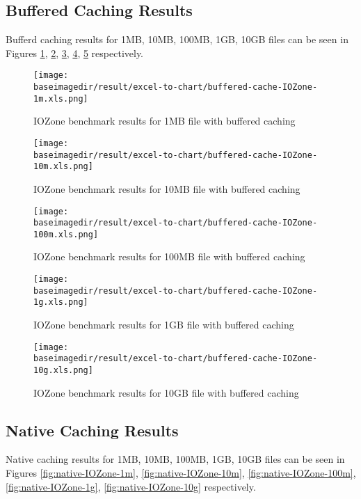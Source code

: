 \documentclass{article}
\newcommand{\baseimagedir}{..}
\begin{document}
\subsection{Buffered Caching Results}
Bufferd caching results for 1MB, 10MB, 100MB, 1GB, 10GB files can be seen in Figures \ref{fig:buffered-IOZone-1m}, \ref{fig:buffered-IOZone-10m}, \ref{fig:buffered-IOZone-100m}, \ref{fig:buffered-IOZone-1g}, \ref{fig:buffered-IOZone-10g} respectively.

\begin{figure}
    \centering
    \texttt{[image: \\baseimagedir/result/excel-to-chart/buffered-cache-IOZone-1m.xls.png]}
    \caption{IOZone benchmark results for 1MB file with buffered caching}
    \label{fig:buffered-IOZone-1m}
\end{figure}

\begin{figure}
    \centering
    \texttt{[image: \\baseimagedir/result/excel-to-chart/buffered-cache-IOZone-10m.xls.png]}
    \caption{IOZone benchmark results for 10MB file with buffered caching}
    \label{fig:buffered-IOZone-10m}
\end{figure}

\begin{figure}
    \centering
    \texttt{[image: \\baseimagedir/result/excel-to-chart/buffered-cache-IOZone-100m.xls.png]}
    \caption{IOZone benchmark results for 100MB file with buffered caching}
    \label{fig:buffered-IOZone-100m}
\end{figure}

\begin{figure}
    \centering
    \texttt{[image: \\baseimagedir/result/excel-to-chart/buffered-cache-IOZone-1g.xls.png]}
    \caption{IOZone benchmark results for 1GB file with buffered caching}
    \label{fig:buffered-IOZone-1g}
\end{figure}

\begin{figure}
    \centering
    \texttt{[image: \\baseimagedir/result/excel-to-chart/buffered-cache-IOZone-10g.xls.png]}
    \caption{IOZone benchmark results for 10GB file with buffered caching}
    \label{fig:buffered-IOZone-10g}
\end{figure}

\subsection{Native Caching Results}
Native caching results for 1MB, 10MB, 100MB, 1GB, 10GB files can be seen in Figures \ref{fig:native-IOZone-1m}, \ref{fig:native-IOZone-10m}, \ref{fig:native-IOZone-100m}, \ref{fig:native-IOZone-1g}, \ref{fig:native-IOZone-10g} respectively.
\end{document}

